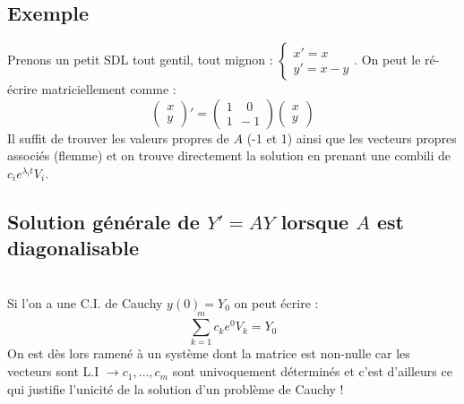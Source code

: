 \documentclass[11pt, a4paper, openany]{book}
\begin{document}
\subsection{Exemple}
Prenons un petit SDL tout gentil, tout mignon : $\left\{\begin{array}{l}
x' = x\\
y' = x-y
\end{array}\right.$. On peut le ré-écrire matriciellement comme :
\begin{equation}
	\left(\begin{array}{l}
	x\\
	y
	\end{array}\right)' = \left(\begin{array}{l}
	1\ \ \  \ \ 0\\
	1\ \ -1
	\end{array}\right)\left(\begin{array}{l}
	x\\
	y
	\end{array}\right)
\end{equation}
Il suffit de trouver les valeurs propres de $A$ (-1 et 1) ainsi que les vecteurs propres associés (flemme) et on trouve directement la solution en prenant une combili de $c_ie^{\lambda_i t}V_i$.
		
\subsection{Solution générale de $Y' = AY$ lorsque $A$ est diagonalisable}
\ \\
		
Si l'on a une C.I. de Cauchy $y(0) = Y_0$ on peut écrire :
\begin{equation}
	\sum_{k=1}^m c_k e^0 V_k = Y_0
\end{equation}
On est dès lors ramené à un système dont la matrice est non-nulle car les vecteurs sont L.I $\rightarrow c_1, \dots,c_m$ sont univoquement déterminés et c'est d'ailleurs ce qui justifie l'unicité de la solution d'un problème de Cauchy !\\
		
\end{document}
